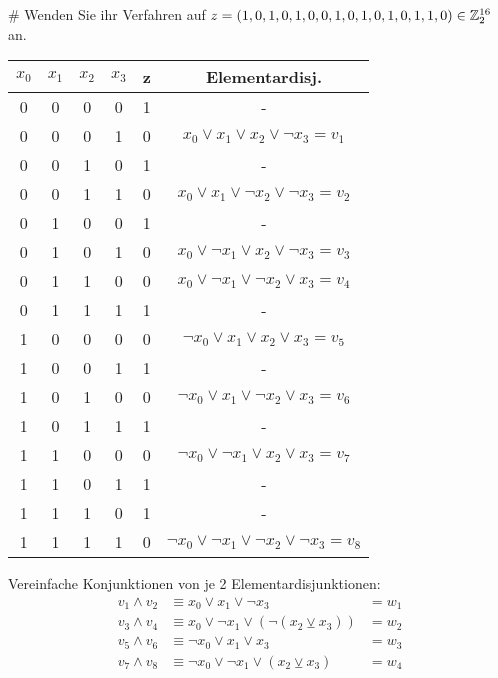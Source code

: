 \begin{myList}
#
Wenden Sie ihr Verfahren auf $z = (1,0,1,0,1,0,0,1,0,1,0,1,0,1,1,0) \in \mathbb{Z}^{16}_{2}$ an.\medskip
\begin{center}
\begin{tabular}{cccccc}
\toprule
$x_0$ & $x_1$ & $x_2$ & $x_3$ & z & Elementardisj. \\ 
\midrule
0 & 0 & 0 & 0 & 1 & - \\ 
0 & 0 & 0 & 1 & 0 & $x_0 \vee x_1 \vee x_2 \vee \neg x_3 = v_1$ \\  
0 & 0 & 1 & 0 & 1 & - \\ 
0 & 0 & 1 & 1 & 0 & $x_0 \vee x_1 \vee \neg x_2 \vee \neg x_3 = v_2$ \\ 
\midrule
0 & 1 & 0 & 0 & 1 & - \\ 
0 & 1 & 0 & 1 & 0 & $x_0 \vee \neg x_1 \vee x_2 \vee \neg x_3 = v_3$ \\ 
0 & 1 & 1 & 0 & 0 & $x_0 \vee \neg x_1 \vee \neg x_2 \vee x_3 = v_4$ \\ 
0 & 1 & 1 & 1 & 1 & - \\ 
\midrule
1 & 0 & 0 & 0 & 0 & $\neg x_0 \vee x_1 \vee x_2 \vee x_3 = v_5$ \\ 
1 & 0 & 0 & 1 & 1 & - \\  
1 & 0 & 1 & 0 & 0 & $\neg x_0 \vee x_1 \vee \neg x_2 \vee x_3 = v_6$ \\ 
1 & 0 & 1 & 1 & 1 & - \\ 
\midrule
1 & 1 & 0 & 0 & 0 & $\neg x_0 \vee \neg x_1 \vee x_2 \vee x_3 = v_7$ \\ 
1 & 1 & 0 & 1 & 1 & - \\ 
1 & 1 & 1 & 0 & 1 & - \\ 
1 & 1 & 1 & 1 & 0 & $\neg x_0 \vee \neg x_1 \vee \neg x_2 \vee \neg x_3 = v_8$ \\ 
\bottomrule 
\end{tabular} 
\end{center}

Vereinfache Konjunktionen von je 2 Elementardisjunktionen:
\begin{align*}
	v_1 \wedge v_2 &\equiv x_0 \vee x_1 \vee \neg x_3  &= w_1\\
	v_3 \wedge v_4 &\equiv x_0 \vee \neg x_1 \vee (\neg(x_2 \veebar x_3)) &= w_2\\
	v_5 \wedge v_6 &\equiv \neg x_0 \vee x_1 \vee x_3 &= w_3\\
	v_7 \wedge v_8 &\equiv \neg x_0 \vee \neg x_1 \vee (x_2 \veebar x_3) &= w_4
\end{align*}


\end{myList}
